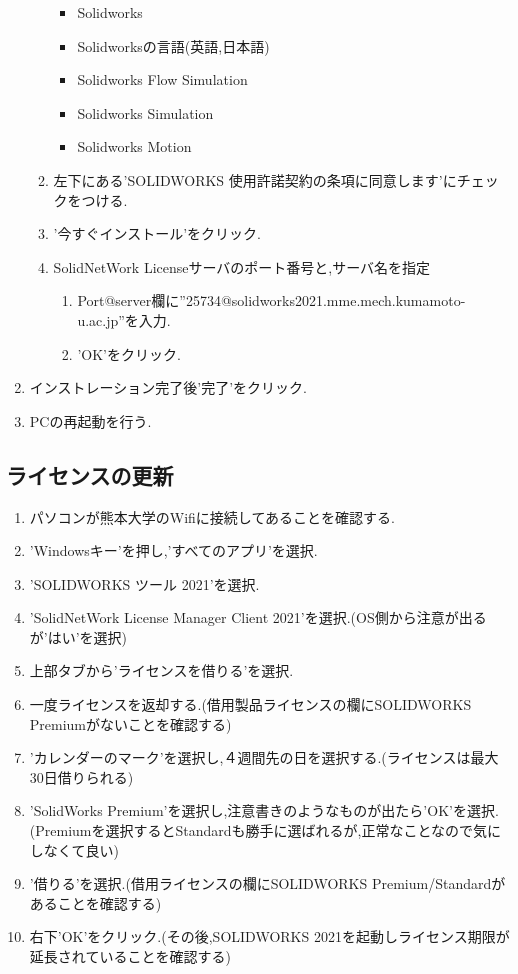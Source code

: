 \documentclass[a4paper,11pt]{jsarticle}
\begin{document}
\begin{enumerate}
\begin{enumerate}
\begin{itemize}
   \item Solidworks
   \item Solidworksの言語(英語,日本語)
   \item Solidworks Flow Simulation
   \item Solidworks Simulation
   \item Solidworks Motion
  \end{itemize}
  \item 左下にある'SOLIDWORKS 使用許諾契約の条項に同意します'にチェックをつける.
  \item '今すぐインストール'をクリック.
  \item SolidNetWork Licenseサーバのポート番号と,サーバ名を指定
  \begin{enumerate}
   \item Port@server欄に''25734@solidworks2021.mme.mech.kumamoto-u.ac.jp''を入力.
   \item 'OK'をクリック.
  \end{enumerate}
 \end{enumerate}
 \item インストレーション完了後'完了'をクリック.
 \item PCの再起動を行う.
\end{enumerate}
\subsection{ライセンスの更新}
\begin{enumerate}
 \item パソコンが熊本大学のWifiに接続してあることを確認する.
 \item 'Windowsキー'を押し,'すべてのアプリ'を選択.
 \item 'SOLIDWORKS ツール 2021'を選択.
 \item 'SolidNetWork License Manager Client 2021'を選択.(OS側から注意が出るが'はい'を選択)
 \item 上部タブから'ライセンスを借りる'を選択.
 \item 一度ライセンスを返却する.(借用製品ライセンスの欄にSOLIDWORKS Premiumがないことを確認する)
 \item 'カレンダーのマーク'を選択し,４週間先の日を選択する.(ライセンスは最大30日借りられる)
 \item 'SolidWorks Premium'を選択し,注意書きのようなものが出たら'OK'を選択.(Premiumを選択するとStandardも勝手に選ばれるが,正常なことなので気にしなくて良い)
 \item '借りる'を選択.(借用ライセンスの欄にSOLIDWORKS Premium/Standardがあることを確認する)
 \item 右下'OK'をクリック.(その後,SOLIDWORKS 2021を起動しライセンス期限が延長されていることを確認する)
\end{enumerate}
\clearpage
\end{document}
